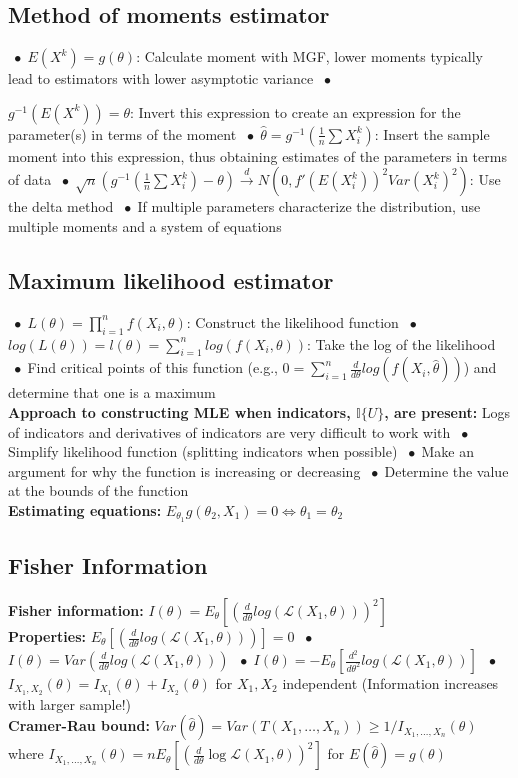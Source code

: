 \documentclass[9pt]{extarticle}
\newcommand*\bspace{$\; \bullet \;$}
\begin{document}
\subsection{Method of moments estimator}
\bspace $E(X^k) = g(\theta)$: Calculate moment with MGF, lower moments typically lead to estimators with lower asymptotic variance \bspace {$g^{-1}(E(X^k)) = \theta$: Invert this expression to create an expression for the parameter(s) in terms of the moment \bspace $\hat{\theta} = g^{-1}(\frac{1}{n}\sum X_i^k)$: Insert the sample moment into this expression, thus obtaining estimates of the parameters in terms of data \bspace $\sqrt{n}(g^{-1}(\frac{1}{n}\sum X_i^k) - \theta) \overset{d}{\longrightarrow}  N(0, f'(E(X_i^k))^2Var(X_i^k)^2)$: Use the delta method \bspace If multiple parameters characterize the distribution, use multiple moments and a system of equations

\subsection{Maximum likelihood estimator}
\bspace $L(\theta) = \prod_{i=1}^nf(X_i, \theta)$: Construct the likelihood function \bspace $log(L(\theta)) = l(\theta) = \sum_{i=1}^nlog(f(X_i, \theta))$: Take the log of the likelihood \bspace Find critical points of this function (e.g., $0 = \sum_{i=1}^n\frac{d}{d\theta}log(f(X_i, \hat{\theta}))$) and determine that one is a maximum \\
\textbf{Approach to constructing MLE when indicators, $\mathbb{I}\{U\}$, are present:} Logs of indicators and derivatives of indicators are very difficult to work with \bspace Simplify likelihood function (splitting indicators when possible) \bspace Make an argument for why the function is increasing or decreasing \bspace Determine the value at the bounds of the function\\
\textbf{Estimating equations:} $E_{\theta_1} g(\theta_2, X_1) = 0 \Longleftrightarrow \theta_1 = \theta_2$
\subsection{Fisher Information}
\textbf{Fisher information: } $I(\theta) = E_\theta \left [ \left (\frac{d}{d\theta}log(\mathcal{L}(X_1, \theta)) \right )^2 \right ]$\\
\textbf{Properties:} $E_\theta \left [ \left (\frac{d}{d\theta}log(\mathcal{L}(X_1, \theta)) \right ) \right ] = 0$ \bspace $I(\theta) = Var \left ( \frac{d}{d\theta}log(\mathcal{L}(X_1, \theta)) \right )$ \bspace $I(\theta) = - E_\theta \left [\frac{d^2}{d\theta^2}log(\mathcal{L}(X_1, \theta)) \right ]$ \bspace $I_{X_1, X_2}(\theta) = I_{X_1}(\theta) + I_{X_2}(\theta)$ for $X_1, X_2$ independent (Information increases with larger sample!)\\
\textbf{Cramer-Rau bound:} $Var(\hat{\theta}) = Var(T(X_1, \dots, X_n)) \geq 1/I_{X_1, \dots, X_n}(\theta)$ where $I_{X_1, \dots, X_n}(\theta) = nE_\theta[(\frac{d}{d\theta} \log \mathcal{L}(X_1, \theta))^2]$ for $E(\hat{\theta}) = g(\theta)$


}
\end{document}
